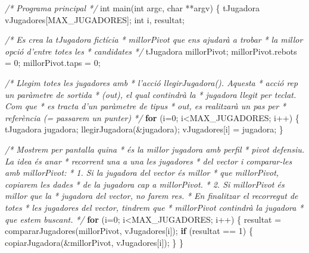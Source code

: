 \documentclass[]{book}
\newenvironment{Shaded}{\begin{snugshade}}{\end{snugshade}}
\newcommand{\DataTypeTok}[1]{\textcolor[rgb]{0.13,0.29,0.53}{#1}}
\newcommand{\DecValTok}[1]{\textcolor[rgb]{0.00,0.00,0.81}{#1}}
\newcommand{\CommentTok}[1]{\textcolor[rgb]{0.56,0.35,0.01}{\textit{#1}}}
\newcommand{\ControlFlowTok}[1]{\textcolor[rgb]{0.13,0.29,0.53}{\textbf{#1}}}
\newcommand{\NormalTok}[1]{#1}
\begin{document}
\begin{Shaded}
\begin{Highlighting}[]
\CommentTok{/* Programa principal */}
\DataTypeTok{int}\NormalTok{ main(}\DataTypeTok{int}\NormalTok{ argc, }\DataTypeTok{char}\NormalTok{ **argv) \{}
\NormalTok{    tJugadora vJugadores[MAX_JUGADORES];}
    \DataTypeTok{int}\NormalTok{ i, resultat;}

    \CommentTok{/* Es crea la tJugadora fictícia }
\CommentTok{     * millorPivot que ens ajudarà a trobar }
\CommentTok{     * la millor opció d'entre totes les }
\CommentTok{     * candidates}
\CommentTok{     */}
\NormalTok{    tJugadora millorPivot; }
\NormalTok{    millorPivot.rebots = }\DecValTok{0}\NormalTok{;}
\NormalTok{    millorPivot.taps = }\DecValTok{0}\NormalTok{;}

    \CommentTok{/* Llegim totes les jugadores amb }
\CommentTok{     * l'acció llegirJugadora(). Aquesta}
\CommentTok{     * acció rep un paràmetre de sortida}
\CommentTok{     * (out), el qual contindrà la }
\CommentTok{     * jugadora llegit per teclat. Com que}
\CommentTok{     * es tracta d'un paràmetre de tipus }
\CommentTok{     * out, es realitzarà un pas per }
\CommentTok{     * referència (= passarem un punter)}
\CommentTok{     */}
    \ControlFlowTok{for}\NormalTok{ (i=}\DecValTok{0}\NormalTok{; i<MAX_JUGADORES; i++) \{}
\NormalTok{        tJugadora jugadora;}
\NormalTok{        llegirJugadora(&jugadora);}
\NormalTok{        vJugadores[i] = jugadora;}
\NormalTok{    \}}

    \CommentTok{/* Mostrem per pantalla quina}
\CommentTok{     * és la millor jugadora amb perfil}
\CommentTok{     * pivot defensiu. La idea és anar}
\CommentTok{     * recorrent una a una les jugadores}
\CommentTok{     * del vector i comparar-les amb millorPivot:}
\CommentTok{     * 1. Si la jugadora del vector és millor}
\CommentTok{     * que millorPivot, copiarem les dades}
\CommentTok{     * de la jugadora cap a millorPivot.}
\CommentTok{     * 2. Si millorPivot és millor que la}
\CommentTok{     * jugadora del vector, no farem res.}
\CommentTok{     * En finalitzar el recorregut de totes}
\CommentTok{     * les jugadores del vector, tindrem que}
\CommentTok{     * millorPivot contindrà la jugadora}
\CommentTok{     * que estem buscant.}
\CommentTok{     */}
    \ControlFlowTok{for}\NormalTok{ (i=}\DecValTok{0}\NormalTok{; i<MAX_JUGADORES; i++) \{}
\NormalTok{        resultat = compararJugadores(millorPivot, vJugadores[i]);}
        \ControlFlowTok{if}\NormalTok{ (resultat == }\DecValTok{1}\NormalTok{) \{}
\NormalTok{            copiarJugadora(&millorPivot, vJugadores[i]);}
\NormalTok{        \}}
\NormalTok{    \}}


\end{Highlighting}
\end{Shaded}
\end{document}
